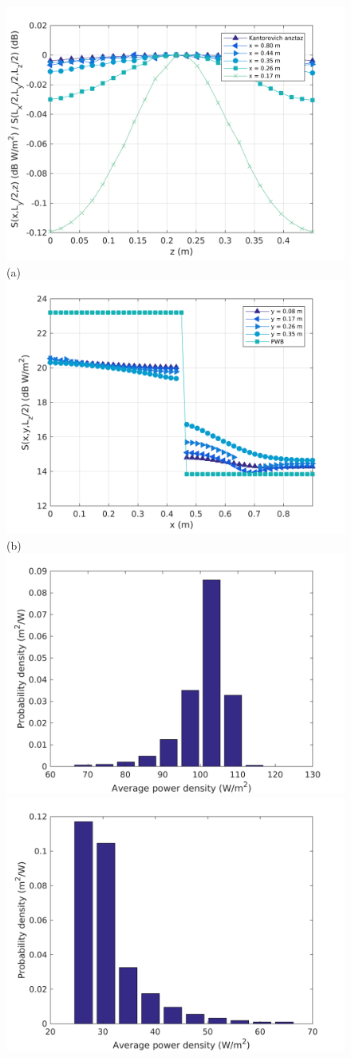 \documentclass[a4paper]{article}
\numberwithin{equation}{section}
\begin{document}
\begin{figure}[hp]
\begin{center}
\includegraphics[width=0.6\linewidth]{figures/SDM_3D_DL_PowerDensityProfileZ}\\
{\footnotesize (a)}\\
\vspace{2mm}
\includegraphics[width=0.6\linewidth]{figures/SDM_3D_DL_PowerDensityProfileX}\\
{\footnotesize (b)}\\
\vspace{2mm}
\includegraphics[width=0.45\linewidth]{figures/SDM_3D_DL_PowerDensityPDF1}
\includegraphics[width=0.45\linewidth]{figures/SDM_3D_DL_PowerDensityPDF2}

\end{center}
\end{figure}
\end{document}
